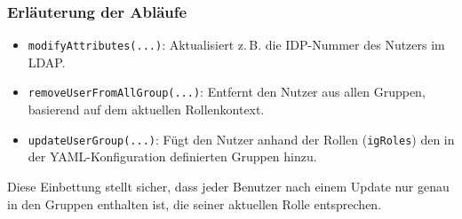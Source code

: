 \subsubsection*{Erläuterung der Abläufe}

\begin{itemize}
    \item \texttt{modifyAttributes(...)}: Aktualisiert z.\,B. die IDP-Nummer des Nutzers im LDAP.
    \item \texttt{removeUserFromAllGroup(...)}: Entfernt den Nutzer aus allen Gruppen, basierend auf dem aktuellen Rollenkontext.
    \item \texttt{updateUserGroup(...)}: Fügt den Nutzer anhand der Rollen (\texttt{igRoles}) den in der YAML-Konfiguration definierten Gruppen hinzu.
\end{itemize}

\noindent Diese Einbettung stellt sicher, dass jeder Benutzer nach einem Update nur genau in den Gruppen enthalten ist, die seiner aktuellen Rolle entsprechen.
